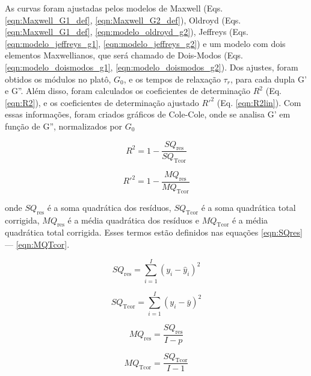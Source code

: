 		As curvas foram ajustadas pelos modelos de Maxwell (Eqs. \ref{eqn:Maxwell_G1_def}, \ref{eqn:Maxwell_G2_def}), Oldroyd (Eqs. \ref{eqn:Maxwell_G1_def}, \ref{eqn:modelo_oldroyd_g2}), Jeffreys (Eqs. \ref{eqn:modelo_jeffreys_g1}, \ref{eqn:modelo_jeffreys_g2}) e um modelo com dois elementos Maxwellianos, que será chamado de Dois-Modos (Eqs. \ref{eqn:modelo_doismodos_g1}, \ref{eqn:modelo_doismodos_g2}). Dos ajustes, foram obtidos os módulos no platô, \(G_0\), e os tempos de relaxação \(\tau_r\), para cada dupla G' e G''. Além disso, foram calculados os coeficientes de determinação \(R^2\) (Eq. \ref{eqn:R2}), e os coeficientes de determinação ajustado \(R\mathrm{'}^{2}\) (Eq. \ref{eqn:R2lin}). Com essas informações, foram criados gráficos de Cole-Cole, onde se analisa G' em função de G'', normalizados por \(G_0\)
		
		\begin{equation}
			R^2 = 1 - \dfrac{SQ_\mathrm{res}}{SQ_\mathrm{Tcor}}
			\label{eqn:R2}
		\end{equation}
		
		\begin{equation}
			R\mathrm{'}^{2} = 1 - \dfrac{MQ_\mathrm{res}}{MQ_\mathrm{Tcor}}
			\label{eqn:R2lin}
		\end{equation}
		
		\noindent onde \(SQ_\mathrm{res}\) é a soma quadrática dos resíduos, \(SQ_\mathrm{Tcor}\) é a soma quadrática total corrigida, \(MQ_\mathrm{res}\) é a média quadrática dos resíduos e \(MQ_\mathrm{Tcor}\) é a média quadrática total corrigida. Esses termos estão definidos nas equações \ref{eqn:SQres} --- \ref{eqn:MQTcor}.
		
		\begin{equation}
			SQ_\mathrm{res} = \sum_{i=1}^{I} \left( y_i - \hat{y}_i \right) ^ 2
			\label{eqn:SQres}
		\end{equation}
		
		\begin{equation}
			SQ_\mathrm{Tcor} = \sum_{i=1}^{I} \left(y_i - \bar{y} \right)^2
			\label{eqn:SQTcor}
		\end{equation}
		
		\begin{equation}
			MQ_\mathrm{res} = \dfrac{SQ_\mathrm{res}}{I-p}
			\label{eqn:MQres}
		\end{equation}
		
		\begin{equation}
			MQ_\mathrm{Tcor} = \dfrac{SQ_\mathrm{Tcor}}{I - 1}
			\label{eqn:MQTcor}
		\end{equation}
		

